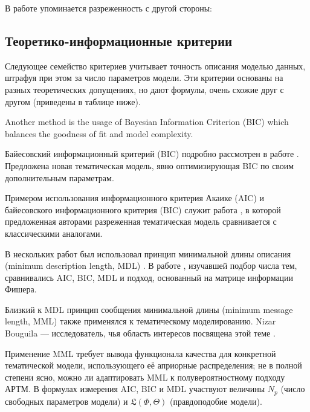 В работе \cite{Mimno} упоминается разреженность с другой стороны: 



\subsection{Теоретико-информационные критерии}

Следующее семейство критериев учитывает точность описания моделью данных, штрафуя при этом за число параметров модели. Эти критерии основаны на разных теоретических допущениях, но дают формулы, очень схожие друг с другом (приведены в таблице ниже).

Another method is the usage of  Bayesian Information Criterion (BIC) which balances the goodness of fit and model complexity. 

Байесовский информационный критерий (BIC) подробно рассмотрен в работе \cite{soleimani14parsimonious}. Предложена новая тематическая модель, явно оптимизирующая BIC по своим дополнительным параметрам.

Примером использования информационного критерия Акаике (AIC) и байесовского информационного критерия (BIC) служит работа \cite{than2012fully}, в которой предложенная авторами разреженная тематическая модель сравнивается с классическими аналогами.

В нескольких работ был использовал принцип минимальной длины описания (minimum description length, MDL) \cite{image_segm}\cite{gerlach2018network}. В работе \cite{mml0}, изучавшей подбор числа тем, сравнивались AIC, BIC, MDL и подход, основанный на матрице информации Фишера.

Близкий к MDL принцип сообщения минимальной длины (minimum message length, MML) также применялся к тематическому моделированию. Nizar Bouguila --- исследователь, чья область интересов посвящена этой теме \cite{mml1}\cite{mml2}\cite{mml3}\cite{mml4}\cite{mml5}. 

Применение MML требует вывода функционала качества для конкретной тематической модели, использующего её априорные распределения; не в полной степени ясно, можно ли адаптировать MML к полувероятностному подходу АРТМ. В формулах измерения AIC, BIC и MDL участвуют величины $N_p$ (число свободных параметров модели) и $\mathfrak{L}(\Phi,\Theta)$ (правдоподобие модели). 

